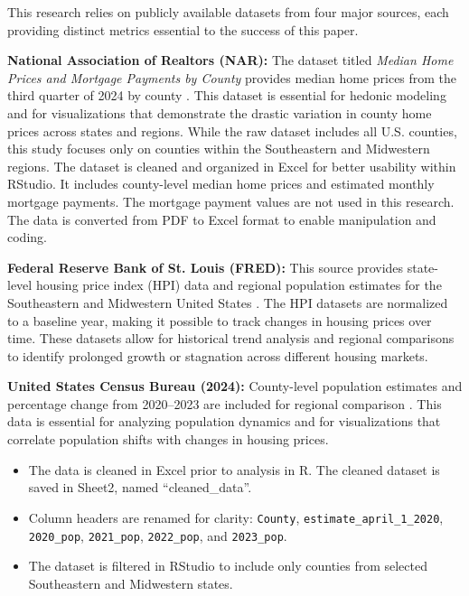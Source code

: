 \documentclass[journal,article,submit,pdftex,moreauthors]{Definitions/mdpi}
\begin{document}
This research relies on publicly available datasets from four major sources, each providing distinct metrics essential to the success of this paper.

\textbf{National Association of Realtors (NAR):} The dataset titled \textit{Median Home Prices and Mortgage Payments by County} provides median home prices from the third quarter of 2024 by county \citep{_2024_county}. This dataset is essential for hedonic modeling and for visualizations that demonstrate the drastic variation in county home prices across states and regions. While the raw dataset includes all U.S. counties, this study focuses only on counties within the Southeastern and Midwestern regions. The dataset is cleaned and organized in Excel for better usability within RStudio. It includes county-level median home prices and estimated monthly mortgage payments. The mortgage payment values are not used in this research. The data is converted from PDF to Excel format to enable manipulation and coding.

\textbf{Federal Reserve Bank of St. Louis (FRED):} This source provides state-level housing price index (HPI) data and regional population estimates for the Southeastern and Midwestern United States \citep{a2024_hpi}. The HPI datasets are normalized to a baseline year, making it possible to track changes in housing prices over time. These datasets allow for historical trend analysis and regional comparisons to identify prolonged growth or stagnation across different housing markets.

\textbf{United States Census Bureau (2024):} County-level population estimates and percentage change from 2020–2023 are included for regional comparison \citep{_2023_county}. This data is essential for analyzing population dynamics and for visualizations that correlate population shifts with changes in housing prices.

\begin{itemize}
  \setlength\itemsep{0pt}
  \setlength\parskip{0pt}
  \setlength\parsep{0pt}
  \item The data is cleaned in Excel prior to analysis in R. The cleaned dataset is saved in Sheet2, named ``cleaned\_data''.
  \item Column headers are renamed for clarity: \texttt{County}, \texttt{estimate\_april\_1\_2020}, \texttt{2020\_pop}, \texttt{2021\_pop}, \texttt{2022\_pop}, and \texttt{2023\_pop}.
  \item The dataset is filtered in RStudio to include only counties from selected Southeastern and Midwestern states.
\end{itemize}
\end{document}
